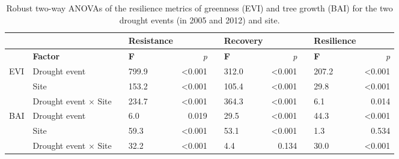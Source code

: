 \begin{table}[ht]
\caption{Robust two-way ANOVAs of the resilience metrics of greenness (EVI) and tree growth (BAI) for the two drought events (in 2005 and 2012) and site.}
\label{tab:dendro:robustanova}
\begingroup\fontsize{8}{10}\selectfont
\begin{tabular}{@{}llllrllrllr@{}}
\toprule
 &  &  & \textbf{Resistance} &  &  & \textbf{Recovery} &  &  & \textbf{Resilience} &  \\ \midrule
 & \textbf{Factor} &  & \textbf{F} & \textit{p} &  & \textbf{F} & \textit{p} &  & \textbf{F} & \textit{p} \\ \cmidrule(lr){4-5} \cmidrule(lr){7-8} \cmidrule(l){10-11} 
\multirow{3}{*}{EVI} & Drought event &  & 799.9 & \textless 0.001 &  & 312.0 & \textless 0.001 &  & 207.2 & \textless 0.001 \\
 & Site &  & 153.2 & \textless 0.001 &  & 105.4 & \textless 0.001 &  & 29.8 & \textless 0.001 \\
 & Drought event $\times$ Site &  & 234.7 & \textless 0.001 &  & 364.3 & \textless 0.001 &  & 6.1 & 0.014 \\ \midrule
\multirow{3}{*}{BAI} & Drought event &  & 6.0 & 0.019 &  & 29.5 & \textless 0.001 &  & 44.3 & \textless 0.001 \\
 & Site &  & 59.3 & \textless 0.001 &  & 53.1 & \textless 0.001 &  & 1.3 & 0.534 \\
 & Drought event $\times$ Site &  & 32.2 & \textless 0.001 &  & 4.4 & 0.134 &  & 30.0 & \textless 0.001 \\ \bottomrule
\end{tabular}
\endgroup{}
\end{table}


